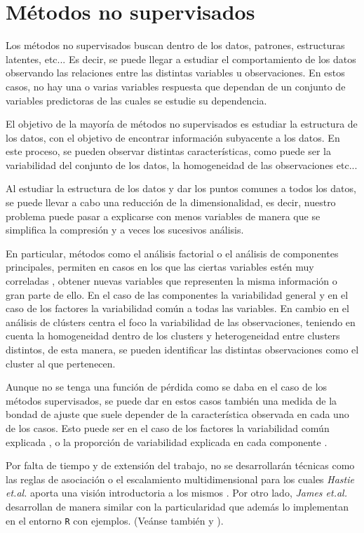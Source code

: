 \chapter{Métodos no supervisados}

\noindent Los métodos no  supervisados buscan dentro de los datos, patrones, estructuras latentes, etc... Es decir, se puede llegar a estudiar el comportamiento de los datos observando las relaciones entre las distintas variables u observaciones.  En estos casos, no hay una o varias  variables respuesta que dependan de un conjunto de variables predictoras de las cuales se estudie su dependencia.    

\noindent El objetivo de la mayoría de métodos no supervisados es estudiar la estructura de los datos, con el objetivo de encontrar información subyacente a los datos. En este proceso, se pueden observar distintas características, como puede ser la variabilidad del conjunto de los datos, la homogeneidad de las observaciones etc...

\noindent Al estudiar la estructura de los datos y dar los puntos comunes a todos los datos, se puede llevar a cabo una reducción de la dimensionalidad, es decir, nuestro problema puede pasar a explicarse con menos variables de manera que se simplifica la compresión \cite{Abdi 2010} y a veces los sucesivos análisis. 

\noindent En particular, métodos como el análisis factorial o el análisis de componentes principales, permiten en casos en los que las ciertas variables estén muy correladas \cite{Everitt 2011}, obtener  nuevas variables que representen la misma información o gran parte de ello. En el caso de las componentes la variabilidad general y en el caso de los factores la variabilidad común a todas las variables. En cambio en el análisis de clústers centra el foco la variabilidad de las observaciones, teniendo en cuenta la homogeneidad dentro de los clusters y heterogeneidad entre clusters distintos, de esta manera, se pueden identificar las distintas observaciones como el cluster al que pertenecen. 

\noindent Aunque no se tenga una función de pérdida como se daba en el caso de los métodos supervisados, se puede dar en estos casos también una medida de la bondad de ajuste que suele depender de la característica observada en cada uno de los casos. Esto puede ser en el caso de los factores la variabilidad común explicada \cite{Peña 2002}, o la proporción de variabilidad explicada en cada componente \cite{Chatfield 1989}. 

\noindent Por falta de tiempo y de extensión del trabajo, no se desarrollarán técnicas como las reglas de asociación o el escalamiento multidimensional para los cuales \emph{Hastie et.al.} aporta una visión introductoria a los mismos \cite{Hastie 2001}. Por otro lado, \emph{James et.al.}\cite{James 2013} desarrollan de manera similar con la particularidad  que además lo implementan en el entorno \texttt{R} con ejemplos. (Veánse también \cite{Everitt 2011} y \cite{Johnson 2007}).

  


\newpage 

\newpage
